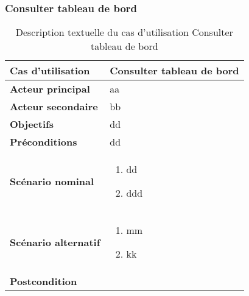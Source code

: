         \subsubsection[Consulter tableau de bord]{Consulter tableau de bord}
        \begin{longtable}{p{4cm} p{9cm}}
            \caption{Description textuelle du cas d’utilisation Consulter tableau de bord}
            \label{table:usecaseConsDash}
            \\\hline\hline
                \textbf{Cas d’utilisation} & \textbf{Consulter tableau de bord}
            \\\hline\hline
                    \textbf{Acteur principal} & aa
                \\
                    \textbf{Acteur secondaire} & bb
                \\
                    \textbf{Objectifs} & dd
                \\
                    \textbf{Préconditions} & dd
                \\
                \textbf{Scénario nominal} &
                    \begin{enumerate}[leftmargin=*]
                        \item dd
                        \item ddd
                    \end{enumerate}
                \\
                \textbf{Scénario alternatif} &
                    \begin{enumerate}[leftmargin=*]
                        \item mm
                        \item kk
                    \end{enumerate}
                \\
                \textbf{Postcondition}
            \\\bottomrule
        \end{longtable}

